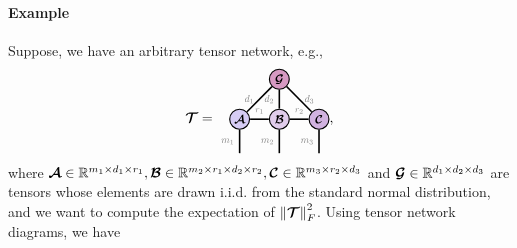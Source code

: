 \paragraph{Example} Suppose, we have an arbitrary tensor network, e.g.,
$$\Tt = 
\begin{tikzpicture}[baseline=\baseline]
   \tikzset{tensor/.style = {minimum size = 0.5cm,shape = circle,thick,draw=black,inner sep = 0pt}, edge/.style = {thick,line width=.4mm},every loop/.style={}}
    \def\y{0}
    \def\x{0}
    \node[tensor,fill=red!20!blue!20!white] (A) at (\x,\y){\scalebox{0.85}{$\At$}}; 
    \node[tensor,fill=red!40!blue!20!white] (B) at (\x+1,\y){\scalebox{0.85}{$\Bt$}};
    \node[tensor,fill=red!40!blue!30!white] (C) at (\x+2,\y){\scalebox{0.85}{$\Ct$}};
    \node[tensor,fill=red!60!blue!40!white] (G) at (\x+1,\y+1){\scalebox{0.85}{$\Gt$}};
    \draw[edge](A)--(B)node[midway,above] {\scalebox{0.7}{\dimcolor{$r_1$}}};
    \draw[edge](B)--(C)node[midway,above] {\scalebox{0.7}{\dimcolor{$r_2$}}};
    \draw[edge](G)--(A)node[midway,left] {\scalebox{0.7}{\dimcolor{$d_1$}}};
    \draw[edge](G)--(B)node[midway,left] {\scalebox{0.7}{\dimcolor{$d_2$}}};
    \draw[edge](G)--(C)node[midway,right] {\scalebox{0.7}{\dimcolor{$d_3$}}};
    \draw[edge](A)--(\x,\y-0.85)node[midway,left] {\scalebox{0.7}{\dimcolor{$m_1$}}};
    \draw[edge](B)--(\x+1,\y-0.85)node[midway,left] {\scalebox{0.7}{\dimcolor{$m_2$}}};
    \draw[edge](C)--(\x+2,\y-0.85)node[midway,left] {\scalebox{0.7}{\dimcolor{$m_3$}}};
\end{tikzpicture},
$$
where $\bm{\mathcal{A}}\in\mathbb{R}^{m_1\times d_1\times r_1}, \bm{\mathcal{B}}\in\mathbb{R}^{m_2\times r_1\times d_2\times r_2}, \bm{\mathcal{C}}\in\mathbb{R}^{m_3\times r_2\times d_3}$ and $\bm{\mathcal{G}}\in\mathbb{R}^{d_1\times d_2\times d_3}$ are tensors whose elements are drawn i.i.d. from the standard normal distribution, and we want to compute the expectation of $\left\lVert\bm{\mathcal{T}}\right\rVert^2_F$. Using tensor network diagrams, we have

